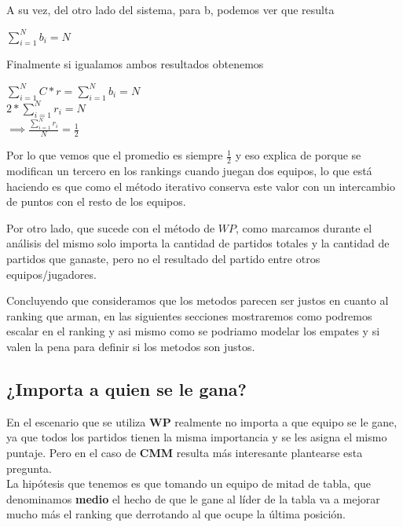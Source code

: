 A su vez, del otro lado del sistema, para b, podemos ver que resulta

\begin{center}
    $\displaystyle\sum_{i=1}^{N}b_i = N$
\end{center}

Finalmente si igualamos ambos resultados obtenemos

\begin{center}
    $\displaystyle\sum_{i=1}^{N}C*r = \displaystyle\sum_{i=1}^{N}b_i = N$\\
    $2*\displaystyle\sum_{i=1}^{N} r_i = N$\\
    $\implies \frac{\displaystyle\sum_{i=1}^{N} r_i}{N} = \frac{1}{2}$\\
\end{center}

Por lo que vemos que el promedio es siempre $\frac{1}{2}$ y eso explica de porque se modifican un tercero en los rankings cuando juegan dos equipos, lo que está haciendo es que como el método iterativo conserva este valor con un intercambio de puntos con el resto de los equipos.

Por otro lado, que sucede con el método de $WP$, como marcamos durante el análisis del mismo solo importa la cantidad de partidos totales y la cantidad de partidos que ganaste, pero no el resultado del partido entre otros equipos/jugadores.

Concluyendo que consideramos que los metodos parecen ser justos en cuanto al ranking que arman, en las siguientes secciones mostraremos como podremos escalar en el ranking y asi mismo como se podriamo modelar los empates y si valen la pena para definir si los metodos son justos.

\subsection{¿Importa a quien se le gana?}

En el escenario que se utiliza \textbf{WP} realmente no importa a que equipo se le gane, ya que todos los partidos tienen la misma importancia y se les asigna el mismo puntaje. Pero en el caso de \textbf{CMM} resulta más interesante plantearse esta pregunta. \\

La hipótesis que tenemos es que tomando un equipo de mitad de tabla, que denominamos \textbf{medio} el hecho de que le gane al líder de la tabla va a mejorar mucho más el ranking que derrotando al que ocupe la última posición. \\

